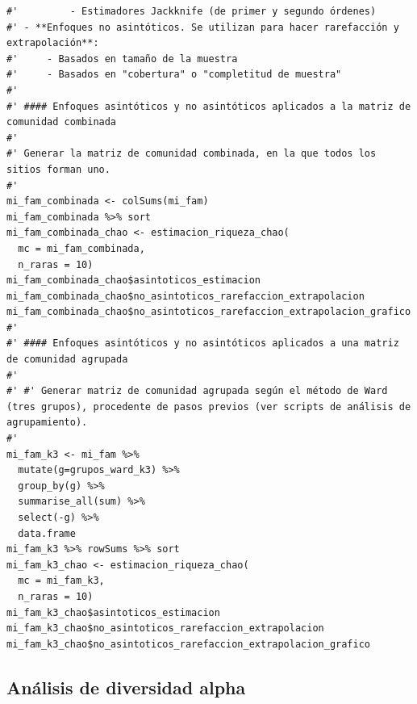 \documentclass[11pt,]{article}
\begin{document}
\begin{verbatim}
#'         - Estimadores Jackknife (de primer y segundo órdenes)
#' - **Enfoques no asintóticos. Se utilizan para hacer rarefacción y extrapolación**:
#'     - Basados en tamaño de la muestra
#'     - Basados en "cobertura" o "completitud de muestra"
#' 
#' #### Enfoques asintóticos y no asintóticos aplicados a la matriz de comunidad combinada
#' 
#' Generar la matriz de comunidad combinada, en la que todos los sitios forman uno.
#' 
mi_fam_combinada <- colSums(mi_fam)
mi_fam_combinada %>% sort
mi_fam_combinada_chao <- estimacion_riqueza_chao(
  mc = mi_fam_combinada,
  n_raras = 10)
mi_fam_combinada_chao$asintoticos_estimacion
mi_fam_combinada_chao$no_asintoticos_rarefaccion_extrapolacion
mi_fam_combinada_chao$no_asintoticos_rarefaccion_extrapolacion_grafico
#'
#' #### Enfoques asintóticos y no asintóticos aplicados a una matriz de comunidad agrupada
#' 
#' #' Generar matriz de comunidad agrupada según el método de Ward (tres grupos), procedente de pasos previos (ver scripts de análisis de agrupamiento).
#' 
mi_fam_k3 <- mi_fam %>%
  mutate(g=grupos_ward_k3) %>%
  group_by(g) %>%
  summarise_all(sum) %>%
  select(-g) %>% 
  data.frame
mi_fam_k3 %>% rowSums %>% sort
mi_fam_k3_chao <- estimacion_riqueza_chao(
  mc = mi_fam_k3,
  n_raras = 10)
mi_fam_k3_chao$asintoticos_estimacion
mi_fam_k3_chao$no_asintoticos_rarefaccion_extrapolacion
mi_fam_k3_chao$no_asintoticos_rarefaccion_extrapolacion_grafico
\end{verbatim}

\subsection{Análisis de diversidad
alpha}\label{anuxe1lisis-de-diversidad-alpha-1}
\end{document}
